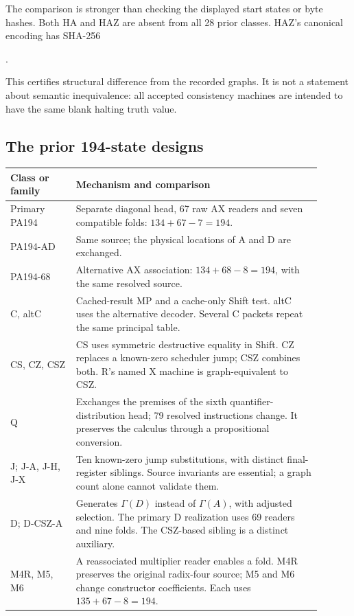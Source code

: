 \documentclass[11pt]{article}
\begin{document}
The comparison is stronger than checking the displayed start states or
byte hashes. Both HA and HAZ are absent from all 28 prior classes. HAZ's
canonical encoding has SHA-256
\begin{center}\small
{}.
\end{center}
This certifies structural difference from the recorded graphs. It is not
a statement about semantic inequivalence: all accepted consistency
machines are intended to have the same blank halting truth value.

\subsection{The prior 194-state designs}

\begin{longtable}{>{\raggedright\arraybackslash}p{0.19\linewidth}p{0.71\linewidth}}
\toprule
Class or family & Mechanism and comparison\\\midrule\endhead
Primary PA194 & Separate diagonal head, 67 raw AX readers and seven compatible folds: $134+67-7=194$.\\
PA194-AD & Same source; the physical locations of A and D are exchanged.\\
PA194-68 & Alternative AX association: $134+68-8=194$, with the same resolved source.\\
C, altC & Cached-result MP and a cache-only Shift test. altC uses the alternative decoder. Several C packets repeat the same principal table.\\
CS, CZ, CSZ & CS uses symmetric destructive equality in Shift. CZ replaces a known-zero scheduler jump; CSZ combines both. R's named X machine is graph-equivalent to CSZ.\\
Q & Exchanges the premises of the sixth quantifier-distribution head; 79 resolved instructions change. It preserves the calculus through a propositional conversion.\\
J; J-A, J-H, J-X & Ten known-zero jump substitutions, with distinct final-register siblings. Source invariants are essential; a graph count alone cannot validate them.\\
D; D-CSZ-A & Generates $\Gamma(D)$ instead of $\Gamma(A)$, with adjusted selection. The primary D realization uses 69 readers and nine folds. The CSZ-based sibling is a distinct auxiliary.\\
M4R, M5, M6 & A reassociated multiplier reader enables a fold. M4R preserves the original radix-four source; M5 and M6 change constructor coefficients. Each uses $135+67-8=194$.\\

\end{longtable}
\end{document}
